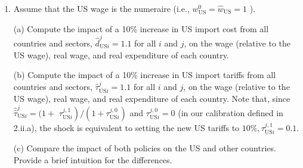 \documentclass[12pt,oneside,reqno]{article}
\begin{document}
\begin{enumerate}[label=\roman*., leftmargin=*]
\item Assume that the US wage is the numeraire (i.e., $w_{\mathrm{US}}^{0}=\hat{w}_{\mathrm{US}}=1$ ).

(a) Compute the impact of a 10\% increase in US import cost from all countries and sectors, $\hat{d}_{\mathrm{US} i}^{j}=1.1$ for all $i$ and $j$, on the wage (relative to the US wage), real wage, and real expenditure of each country.

(b) Compute the impact of a 10\% increase in US import tariffs from all countries and sectors, $\hat{\tau}_{\mathrm{US} i}^{j}=1.1$ for all $i$ and $j$, on the wage (relative to the US wage), real wage, and real expenditure of each country. Note that, since $\hat{\hat{\tau}}_{\mathrm{US} i}^{j}=(1+$ $\left.\tau_{\mathrm{US} i}^{j, 1}\right) /\left(1+\tau_{\mathrm{US} i}^{j, 0}\right)$ and $\tau_{\mathrm{US} i}^{j, 0}=0$ (in our calibration defined in 2.ii.a), the shock is equivalent to setting the new US tariffs to $10 \%, \tau_{\mathrm{US} i}^{j, 1}=0.1$.

(c) Compare the impact of both policies on the US and other countries. Provide a brief intuition for the differences.

\end{enumerate}
\end{document}
